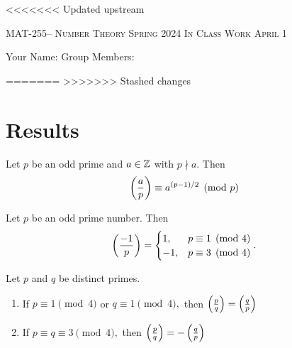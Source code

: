 \documentclass[handout]{ximera}
\date{April 1, 2024}
\date{\classday, 2024}
\begin{document}
\handoutAbstract
\maketitle
<<<<<<< Updated upstream
 	\begin{center}%
    	{\large \scshape MAT-255-- Number Theory 
			\hfill Spring 2024 
			\hfill In Class Work April 1}%
    
		{\large Your Name: \hrulefill \quad 
			Group Members:\hrulefill \quad 
			\hrulefill
			\par}%
 	\end{center}%
=======
>>>>>>> Stashed changes
	 
\section*{Results}
\begin{theorem}\label{thm:euler-quads}
	Let $p$ be an odd prime and $a\in\mathbb Z$ with $p\nmid a.$ Then \[\left(\frac{a}{p}\right)\equiv a^{(p-1)/2}\pmod{p}\]
\end{theorem}


\begin{theorem}[Theorem 4.6]\label{thm:residue-neg1}
	Let $p$ be an odd prime number. Then 
	\[
		\left(\frac{-1}{p}\right)=
			\begin{cases}
 				1, & p\equiv 1\pmod{4}\\
				-1, & p\equiv 3\pmod{4}
			\end{cases}.
	\]
\end{theorem}

\begin{theorem}\label{quad-rec}
	Let $p$ and $q$ be distinct primes.  
	\begin{enumerate}[label=(\alph*)]
		\item If $p\equiv 1 \pmod{4}$ or $q\equiv 1\pmod{4},$ then $\left(\frac{p}{q}\right)=\left(\frac{q}{p}\right)$
 		\item If $p\equiv q \equiv 3 \pmod{4},$ then $\left(\frac{p}{q}\right)=-\left(\frac{q}{p}\right)$
	\end{enumerate}
\end{theorem}
\end{document}
